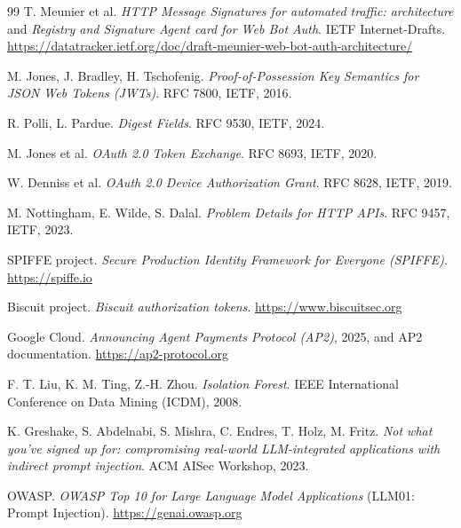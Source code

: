 \begin{thebibliography}{99}
 T. Meunier et al. \emph{HTTP Message Signatures for automated traffic: architecture} and \emph{Registry and Signature Agent card for Web Bot Auth}. IETF Internet-Drafts. \url{https://datatracker.ietf.org/doc/draft-meunier-web-bot-auth-architecture/}

 M. Jones, J. Bradley, H. Tschofenig. \emph{Proof-of-Possession Key Semantics for JSON Web Tokens (JWTs)}. RFC 7800, IETF, 2016.

 R. Polli, L. Pardue. \emph{Digest Fields}. RFC 9530, IETF, 2024.

 M. Jones et al. \emph{OAuth 2.0 Token Exchange}. RFC 8693, IETF, 2020.

 W. Denniss et al. \emph{OAuth 2.0 Device Authorization Grant}. RFC 8628, IETF, 2019.

 M. Nottingham, E. Wilde, S. Dalal. \emph{Problem Details for HTTP APIs}. RFC 9457, IETF, 2023.

 SPIFFE project. \emph{Secure Production Identity Framework for Everyone (SPIFFE)}. \url{https://spiffe.io}

 Biscuit project. \emph{Biscuit authorization tokens}. \url{https://www.biscuitsec.org}

 Google Cloud. \emph{Announcing Agent Payments Protocol (AP2)}, 2025, and AP2 documentation. \url{https://ap2-protocol.org}

 F. T. Liu, K. M. Ting, Z.-H. Zhou. \emph{Isolation Forest}. IEEE International Conference on Data Mining (ICDM), 2008.

 K. Greshake, S. Abdelnabi, S. Mishra, C. Endres, T. Holz, M. Fritz. \emph{Not what you've signed up for: compromising real-world LLM-integrated applications with indirect prompt injection}. ACM AISec Workshop, 2023.

 OWASP. \emph{OWASP Top 10 for Large Language Model Applications} (LLM01: Prompt Injection). \url{https://genai.owasp.org}

\end{thebibliography}
